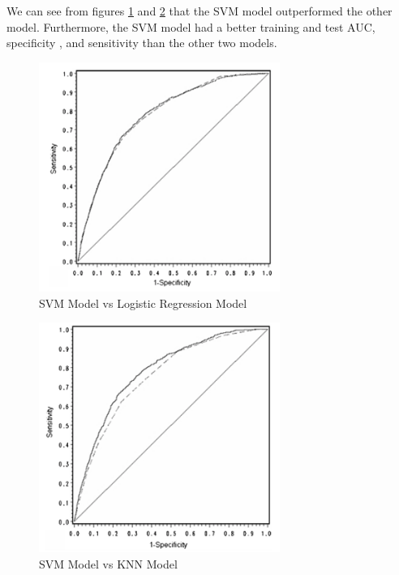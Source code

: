 We can see from figures \ref{fig:SVMLR} and \ref{fig:SVMKNN} that the SVM model outperformed the other model. Furthermore, the SVM model had a better training and test AUC, specificity , and sensitivity than the other two models. 

\vspace{15pt}

\begin{figure}[!htb]
\centering
\includegraphics[width=0.7\textwidth]{images/SVMLR.png}
\caption{SVM Model vs Logistic Regression Model}
\label{fig:SVMLR}
\end{figure}

\begin{figure}[!htb]
\centering
\includegraphics[width=0.7\textwidth]{images/SVMKNN.png}
\caption{SVM Model vs KNN Model}
\label{fig:SVMKNN}
\end{figure}


